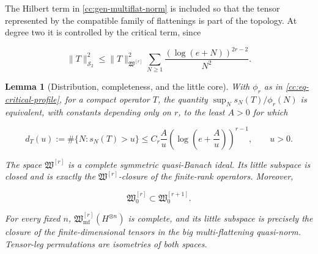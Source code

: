 \documentclass[10pt,reqno]{amsart}
\theoremstyle{plain}
\newtheorem{lemma}[theorem]{Lemma}
\theoremstyle{definition}
\theoremstyle{remark}
\begin{document}
The Hilbert term in \eqref{cc:gen-multiflat-norm} is included so that the
tensor represented by the compatible family of flattenings is part of the
topology.  At degree two it is controlled by the critical term, since

\[
 \|T\|_{\mathcal S_2}^2
 \leq \|T\|_{\mathfrak W^{[r]}}^2
 \sum_{N\geq1}\frac{(\log(e+N))^{2r-2}}{N^2}.
\]

\begin{lemma}[Distribution, completeness, and the little core]
\label{cc:gen-lemma-critical-spaces}
With \(\phi_r\) as in \eqref{cc:eq-critical-profile}, for a compact operator \(T\), the quantity
\(\sup_Ns_N(T)/\phi_r(N)\) is equivalent, with constants depending only
on \(r\), to the least \(A>0\) for which

\begin{equation}
 d_T(u):=\#\{N:s_N(T)>u\}
 \leq C_r\frac Au
 \left(\log\left(e+\frac Au\right)\right)^{r-1},
 \qquad u>0.
 \label{cc:gen-distribution-bound}
\end{equation}

The space \(\mathfrak W^{[r]}\) is a complete symmetric quasi-Banach
ideal.  Its little subspace is closed and is exactly the
\(\mathfrak W^{[r]}\)-closure of the finite-rank operators.  Moreover,

\[
 \mathfrak W^{[r]}_0\subset\mathfrak W^{[r+1]}_0.
\]

For every fixed \(n\),
\(\mathfrak W_{\mathrm{mf}}^{[r]}(H^{\otimes n})\) is complete, and its
little subspace is precisely the closure of the finite-dimensional tensors
in the big multi-flattening quasi-norm.  Tensor-leg permutations are
isometries of both spaces.
\end{lemma}
\end{document}
